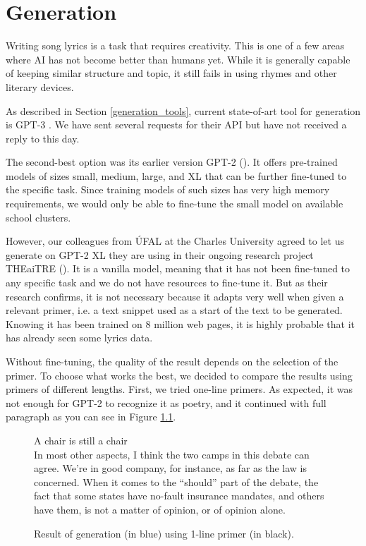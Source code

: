 \chapter{Generation}\label{generation}
Writing song lyrics is a task that requires creativity. This is one of a few areas where AI has not become better than humans yet. While it is generally capable of keeping similar structure and topic, it still fails in using rhymes and other literary devices.

As described in Section \ref{generation_tools},  current state-of-art tool for generation is GPT-3 \citep{brown2020gpt3}. We have sent several requests for their API but have not received a reply to this day.

The second-best option was its earlier version GPT-2 (\cite{radford2019gpt2}). It offers pre-trained models of sizes small, medium, large, and XL that can be further fine-tuned to the specific task. Since training models of such sizes has very high memory requirements, we would only be able to fine-tune the small model on available school clusters. 

However, our colleagues from ÚFAL at the Charles University agreed to let us generate on GPT-2 XL they are using in their ongoing research project THEaiTRE (\cite{rosa2021theaitre}). It is a vanilla model, meaning that it has not been fine-tuned to any specific task and we do not have resources to fine-tune it. But as their research confirms, it is not necessary because it adapts very well when given a relevant primer, i.e. a text snippet used as a start of the text to be generated. Knowing it has been trained on 8 million web pages, it is highly probable that it has already seen some lyrics data. 

Without fine-tuning, the quality of the result depends on the selection of the primer. To choose what works the best, we decided to compare the results using primers of different lengths. First, we tried one-line primers. As expected, it was not enough for GPT-2 to recognize it as poetry, and it continued with full paragraph as you can see in Figure \ref{fig_1line_primer}.

\begin{figure}[htb]\centering
	A chair is still a chair \\
	\color{blue}In most other aspects, I think the two camps in this debate can agree. We're in good company, for instance, as far as the law is concerned. When it comes to the ``should'' part of the debate, the fact that some states have no-fault insurance mandates, and others have them, is not a matter of opinion, or of opinion alone. \\
	\endminipage\hfill
	\caption{Result of generation (in blue) using  1-line primer (in black).} \label{fig_1line_primer}
\end{figure} 

